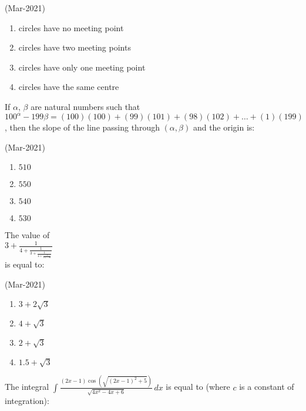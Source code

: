 	\hfill{(Mar-2021)}
	\begin{multicols}{2}
                \begin{enumerate}
    \item circles have no meeting point
    \item circles have two meeting points
    \item circles have only one meeting point
    \item circles have the same centre
                \end{enumerate}
	\end{multicols}
	\item
                If $\alpha$, $\beta$ are natural numbers such that $100^{\alpha} - 199\beta = (100)(100) + (99)(101) + (98)(102) + \ldots + (1)(199)$, then the slope of the line passing through $(\alpha ,\beta)$ and the origin is:

			\hfill{(Mar-2021)}
			\begin{multicols}{4}
                \begin{enumerate}
    \item $ 510 $
    \item $ 550 $
    \item $ 540 $
    \item $ 530 $
                \end{enumerate}
			\end{multicols}
	\item
		The value of \\
		$ 3 + \frac{1}{4 + \frac{1}{3 + \frac{1}{4 + \frac{1}{3 + \ldots \infty}}}} $  \\
		is equal to:

			\hfill{(Mar-2021)}
			\begin{multicols}{2}
		\begin{enumerate}
    \item $ 3 + 2\sqrt{3} $
    \item $ 4 + \sqrt{3} $
    \item $ 2 + \sqrt{3} $
    \item $ 1.5 + \sqrt{3} $
                \end{enumerate}
			\end{multicols}
	\item
		The integral $
\int \frac{(2x - 1) \cos\left(\sqrt{(2x - 1)^2 + 5}\right)}{\sqrt{4x^2 - 4x + 6}} \, dx $ is equal to (where \( c \) is a constant of integration):

